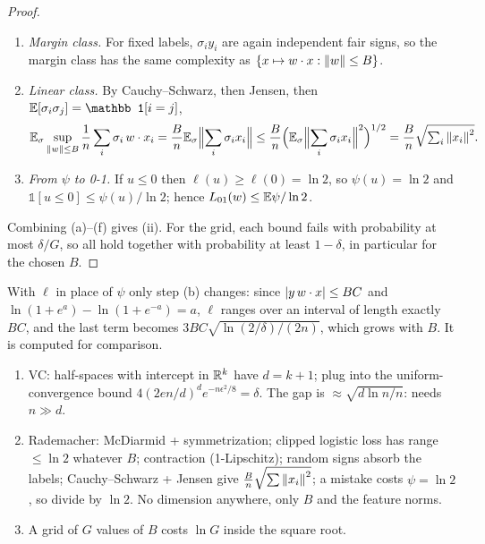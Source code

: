 \begin{proof}
\begin{enumerate}[label=(\alph*),leftmargin=*]
  condition $\varphi_i(0)=0$), applied to the margin vectors $(y_i\,w\cdot x_i)_{i\le n}$ with
  $\varphi_i=\psi$, $\hat R_S(\cF)\le\hat R_S(\{(x,y)\mapsto y\,w\cdot x\})$.
  \item \emph{Margin class.} For fixed labels, $\sigma_iy_i$ are again independent fair signs, so
  the margin class has the same complexity as $\{x\mapsto w\cdot x:\left\lVert w \right\rVert\le B\}$.
  \item \emph{Linear class.} By Cauchy--Schwarz, then Jensen, then $\E[\sigma_i\sigma_j]=\mathbb 1[i=j]$,
  \[ \mathbb{E}_\sigma\sup_{\left\lVert w \right\rVert\le B}\frac1n\sum_i\sigma_i\,w\cdot x_i=\frac Bn\mathbb{E}_\sigma\Bigl\lVert\sum_i\sigma_ix_i\Bigr\rVert
     \le\frac Bn\Bigl(\mathbb{E}_\sigma\Bigl\lVert\sum_i\sigma_ix_i\Bigr\rVert^2\Bigr)^{1/2}=\frac Bn\sqrt{\textstyle\sum_i\left\lVert x_i \right\rVert^2}. \]
  \item \emph{From $\psi$ to 0-1.} If $u\le0$ then $\ell(u)\ge\ell(0)=\ln2$, so $\psi(u)=\ln2$ and
  $\mathbb 1[u\le0]\le\psi(u)/\ln2$; hence $L_{01}(w)\le\mathbb{E}\psi/\ln2$.
\end{enumerate}
Combining (a)--(f) gives (ii). For the grid, each bound fails with probability at most $\delta/G$,
so all hold together with probability at least $1-\delta$, in particular for the chosen $B$.
\end{proof}

\begin{remark}
With $\ell$ in place of $\psi$ only step (b) changes: since $\left\lvert y\,w\cdot x \right\rvert\le BC$ and
$\ln(1+e^{a})-\ln(1+e^{-a})=a$, $\ell$ ranges over an interval of length exactly $BC$, and the last
term becomes $3BC\sqrt{\ln(2/\delta)/(2n)}$, which grows with $B$. It is computed for comparison.
\end{remark}

\begin{inshort}
\begin{enumerate}[leftmargin=*]
  \item VC: half-spaces with intercept in $\mathbb{R}^k$ have $d=k+1$; plug into the uniform-convergence
    bound $4(2en/d)^de^{-n\epsilon^2/8}=\delta$. The gap is $\approx\sqrt{d\ln n/n}$: needs $n\gg d$.
  \item Rademacher: McDiarmid + symmetrization; clipped logistic loss has range $\le\ln2$ whatever
    $B$; contraction (1-Lipschitz); random signs absorb the labels; Cauchy--Schwarz + Jensen give
    $\frac Bn\sqrt{\sum\left\lVert x_i \right\rVert^2}$; a mistake costs $\psi=\ln2$, so divide by $\ln2$.
    No dimension anywhere, only $B$ and the feature norms.
  \item A grid of $G$ values of $B$ costs $\ln G$ inside the square root.
\end{enumerate}
\end{inshort}

